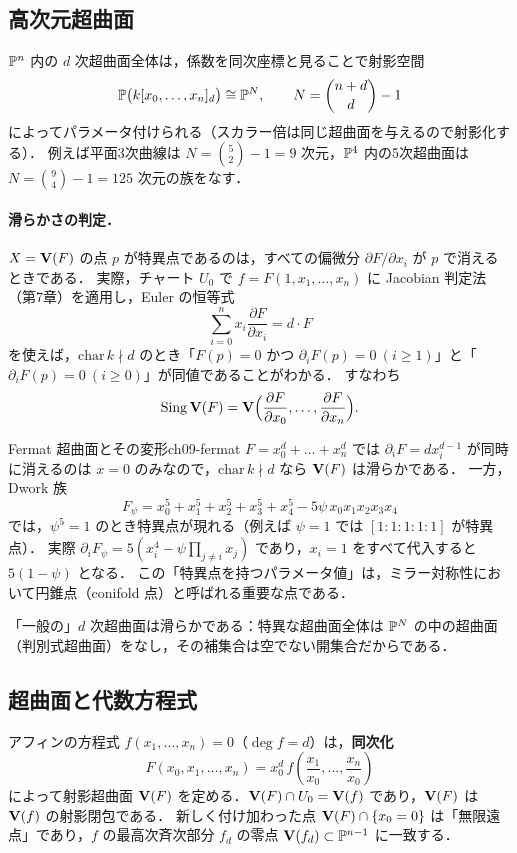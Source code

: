 \subsection{高次元超曲面}

$\mathbb{P}^n$ 内の $d$ 次超曲面全体は，係数を同次座標と見ることで射影空間
\[
  \mathbb{P}\bigl(k[x_0,\dots,x_n]_d\bigr)\cong\mathbb{P}^{N},\qquad N=\binom{n+d}{d}-1
\]
によってパラメータ付けられる（スカラー倍は同じ超曲面を与えるので射影化する）．
例えば平面3次曲線は $N=\binom{5}{2}-1=9$ 次元，$\mathbb{P}^4$ 内の5次超曲面は $N=\binom{9}{4}-1=125$ 次元の族をなす．

\paragraph{滑らかさの判定．}
$X=\mathbf{V}(F)$ の点 $p$ が特異点であるのは，すべての偏微分 $\partial F/\partial x_i$ が $p$ で消えるときである．
実際，チャート $U_0$ で $f=F(1,x_1,\dots,x_n)$ に Jacobian 判定法（第7章）を適用し，Euler の恒等式
\[
  \sum_{i=0}^n x_i\frac{\partial F}{\partial x_i}=d\cdot F
\]
を使えば，$\mathrm{char}\,k\nmid d$ のとき「$F(p)=0$ かつ $\partial_iF(p)=0\ (i\ge1)$」と「$\partial_iF(p)=0\ (i\ge0)$」が同値であることがわかる．
すなわち
\[
  \operatorname{Sing}\mathbf{V}(F)=\mathbf{V}\Bigl(\frac{\partial F}{\partial x_0},\dots,\frac{\partial F}{\partial x_n}\Bigr).
\]

\begin{myex}{Fermat 超曲面とその変形}{ch09-fermat}
$F=x_0^d+\dots+x_n^d$ では $\partial_iF=dx_i^{d-1}$ が同時に消えるのは $x=0$ のみなので，$\mathrm{char}\,k\nmid d$ なら $\mathbf{V}(F)$ は滑らかである．
一方，Dwork 族
\[
  F_\psi=x_0^5+x_1^5+x_2^5+x_3^5+x_4^5-5\psi\,x_0x_1x_2x_3x_4
\]
では，$\psi^5=1$ のとき特異点が現れる（例えば $\psi=1$ では $[1:1:1:1:1]$ が特異点）．
実際 $\partial_iF_\psi=5(x_i^4-\psi\prod_{j\neq i}x_j)$ であり，$x_i=1$ をすべて代入すると $5(1-\psi)$ となる．
この「特異点を持つパラメータ値」は，ミラー対称性において円錐点（conifold 点）と呼ばれる重要な点である．
\end{myex}

「一般の」$d$ 次超曲面は滑らかである：特異な超曲面全体は $\mathbb{P}^N$ の中の超曲面（判別式超曲面）をなし，その補集合は空でない開集合だからである．

\subsection{超曲面と代数方程式}

アフィンの方程式 $f(x_1,\dots,x_n)=0$（$\deg f=d$）は，\textbf{同次化}
\[
  F(x_0,x_1,\dots,x_n)=x_0^{d}\,f\!\left(\frac{x_1}{x_0},\dots,\frac{x_n}{x_0}\right)
\]
によって射影超曲面 $\mathbf{V}(F)$ を定める．$\mathbf{V}(F)\cap U_0=\mathbf{V}(f)$ であり，$\mathbf{V}(F)$ は $\mathbf{V}(f)$ の射影閉包である．
新しく付け加わった点 $\mathbf{V}(F)\cap\{x_0=0\}$ は「無限遠点」であり，$f$ の最高次斉次部分 $f_d$ の零点 $\mathbf{V}(f_d)\subset\mathbb{P}^{n-1}$ に一致する．

